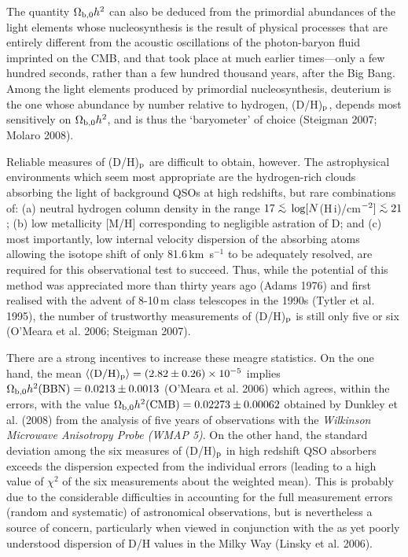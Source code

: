 \documentclass[useAMS,usenatbib]{mn2e}
\begin{document}
The quantity $\Omega_{\rm b,0} h^2$ can also be deduced from
the primordial abundances of the light elements whose
nucleosynthesis is the result of
physical processes that are entirely different
from the acoustic oscillations of the
photon-baryon fluid imprinted on the CMB, and that took place
at much earlier times---only a few hundred seconds, rather than
a few hundred thousand years, after the Big Bang.
Among the light elements produced by primordial
nucleosynthesis, deuterium is the one whose
abundance by number relative to hydrogen,
(D/H)$_{\rm p}$, depends
most sensitively on $\Omega_{\rm b,0} h^2$, and is thus
the `baryometer' of choice
(Steigman 2007; Molaro 2008).

Reliable measures of (D/H)$_{\rm p}$ are difficult to obtain, however.
The astrophysical environments which seem most appropriate are the
hydrogen-rich clouds absorbing the light of background QSOs
at high redshifts, but rare combinations of: (a) neutral hydrogen
column density in the range
$17 \simlt \log [N$(H\,{\sc i})/cm$^{-2}] \simlt 21$;
(b) low metallicity [M/H] corresponding
to negligible astration of D; and (c) most importantly, low internal
velocity dispersion of the absorbing atoms allowing the isotope shift
of only 81.6\,km~s$^{-1}$ to be adequately resolved, are required
for this observational test to succeed.
Thus, while the potential of this method was appreciated
more than thirty years ago (Adams 1976) and first realised
with the advent of 8-10\,m class telescopes in the 1990s
(Tytler et al. 1995), the number of trustworthy measurements
of (D/H)$_{\rm p}$ is still only five or six (O'Meara et al. 2006;
Steigman 2007).

There are a strong incentives to increase these meagre statistics.
On the one hand,
the mean $\langle {\rm (D/H)_p} \rangle = (2.82\pm 0.26) \times 10^{-5}$
implies $\Omega_{\rm b,0} h^2 {\rm (BBN)} = 0.0213 \pm 0.0013$ (O'Meara et al. 2006)
which agrees, within the errors,
with the value
$\Omega_{\rm b,0} h^2 {\rm (CMB)} = 0.02273 \pm 0.00062$
obtained by Dunkley et al. (2008) from the analysis of five
years of observations with the \textit{Wilkinson
Microwave Anisotropy Probe (WMAP 5)}.
On the other hand, the standard deviation among the six
measures of (D/H)$_{\rm p}$ in high redshift
QSO absorbers exceeds the dispersion expected
from the individual errors (leading to a high value
of $\chi^2$ of the six measurements about the
weighted mean).
This is probably due to the considerable difficulties
in accounting for
the full measurement errors
(random and systematic) of astronomical
observations, but is nevertheless a source of concern,
particularly when viewed in conjunction with the
as yet poorly understood dispersion of D/H values
in the Milky Way (Linsky et al. 2006).
\end{document}
